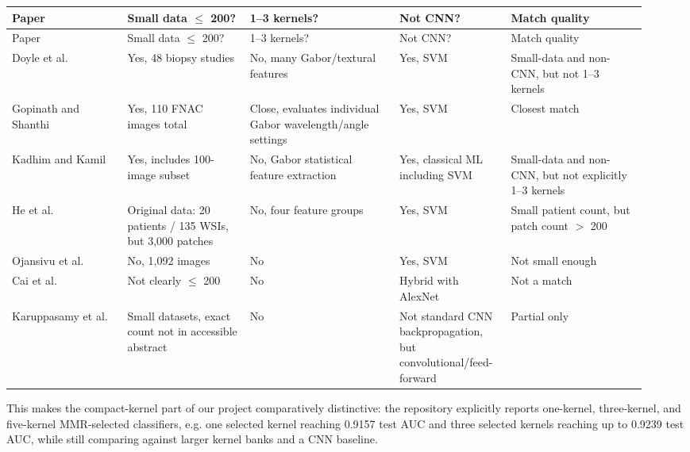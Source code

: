 \documentclass[9pt]{article}
\begin{document}
\scriptsize
\begin{longtable}{p{0.17\linewidth}p{0.18\linewidth}p{0.22\linewidth}p{0.16\linewidth}p{0.20\linewidth}}
\toprule
Paper & Small data $\leq$ 200? & 1--3 kernels? & Not CNN? & Match quality \\
\midrule
\endfirsthead
\toprule
Paper & Small data $\leq$ 200? & 1--3 kernels? & Not CNN? & Match quality \\
\midrule
\endhead

Doyle et al. \cite{doyle2008} & Yes, 48 biopsy studies & No, many Gabor/textural features & Yes, SVM & Small-data and non-CNN, but not 1--3 kernels \\

Gopinath and Shanthi \cite{gopinath2013} & Yes, 110 FNAC images total & Close, evaluates individual Gabor wavelength/angle settings & Yes, SVM & Closest match \\

Kadhim and Kamil \cite{kadhim2023} & Yes, includes 100-image subset & No, Gabor statistical feature extraction & Yes, classical ML including SVM & Small-data and non-CNN, but not explicitly 1--3 kernels \\

He et al. \cite{he2023} & Original data: 20 patients / 135 WSIs, but 3,000 patches & No, four feature groups & Yes, SVM & Small patient count, but patch count $>$ 200 \\

Ojansivu et al. \cite{ojansivu2013} & No, 1,092 images & No & Yes, SVM & Not small enough \\

Cai et al. \cite{cai2022} & Not clearly $\leq$ 200 & No & Hybrid with AlexNet & Not a match \\

Karuppasamy et al. \cite{karuppasamy2024} & Small datasets, exact count not in accessible abstract & No & Not standard CNN backpropagation, but convolutional/feed-forward & Partial only \\

\bottomrule
\end{longtable}

\normalsize
This makes the compact-kernel part of our project comparatively distinctive: the repository explicitly reports one-kernel, three-kernel, and five-kernel MMR-selected classifiers, e.g. one selected kernel reaching 0.9157 test AUC and three selected kernels reaching up to 0.9239 test AUC, while still comparing against larger kernel banks and a CNN baseline.
\end{document}
